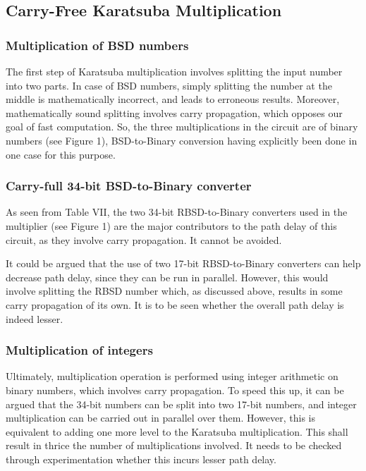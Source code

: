 \documentclass[conference]{IEEEtran_NCC}
\begin{document}
\subsection{Carry-Free Karatsuba Multiplication}

\subsubsection{Multiplication of BSD numbers}

The first step of Karatsuba multiplication involves splitting the input number into two parts. In case of BSD numbers, simply splitting the number at the middle is mathematically incorrect, and leads to erroneous results. Moreover, mathematically sound splitting involves carry propagation, which opposes our goal of fast computation. So, the three multiplications in the circuit are of binary numbers (see Figure 1), BSD-to-Binary conversion having explicitly been done in one case for this purpose.

\subsubsection{Carry-full 34-bit BSD-to-Binary converter}

As seen from Table VII, the two 34-bit RBSD-to-Binary converters used in the multiplier (see Figure 1) are the major contributors to the path delay of this circuit, as they involve carry propagation. It cannot be avoided.

It could be argued that the use of two 17-bit RBSD-to-Binary converters can help decrease path delay, since they can be run in parallel. However, this would involve splitting the RBSD number which, as discussed above, results in some carry propagation of its own. It is to be seen whether the overall path delay is indeed lesser.

\subsubsection{Multiplication of integers}

Ultimately, multiplication operation is performed using integer arithmetic on binary numbers, which involves carry propagation. To speed this up, it can be argued that the 34-bit numbers can be split into two 17-bit numbers, and integer multiplication can be carried out in parallel over them. However, this is equivalent to adding one more level to the Karatsuba multiplication. This shall result in thrice the number of multiplications involved. It needs to be checked through experimentation whether this incurs lesser path delay.
\end{document}
